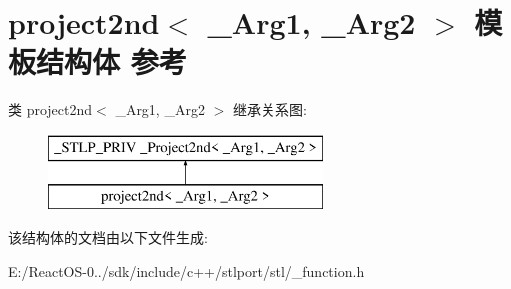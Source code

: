 \hypertarget{structproject2nd}{}\section{project2nd$<$ \+\_\+\+Arg1, \+\_\+\+Arg2 $>$ 模板结构体 参考}
\label{structproject2nd}
类 project2nd$<$ \+\_\+\+Arg1, \+\_\+\+Arg2 $>$ 继承关系图\+:\begin{figure}[H]
\begin{center}
\leavevmode
\includegraphics[height=2.000000cm]{structproject2nd}
\end{center}
\end{figure}


该结构体的文档由以下文件生成\+:\begin{DoxyCompactItemize}
\item 
E\+:/\+React\+O\+S-\/0../sdk/include/c++/stlport/stl/\+\_\+function.\+h\end{DoxyCompactItemize}
